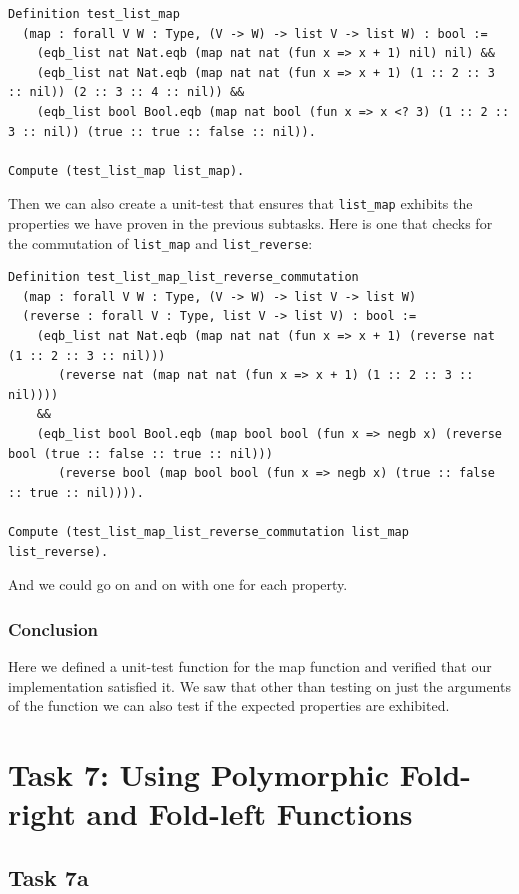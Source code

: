 \documentclass{article}
\begin{document}
\begin{lstlisting}
Definition test_list_map
  (map : forall V W : Type, (V -> W) -> list V -> list W) : bool :=
    (eqb_list nat Nat.eqb (map nat nat (fun x => x + 1) nil) nil) &&
    (eqb_list nat Nat.eqb (map nat nat (fun x => x + 1) (1 :: 2 :: 3 :: nil)) (2 :: 3 :: 4 :: nil)) &&
    (eqb_list bool Bool.eqb (map nat bool (fun x => x <? 3) (1 :: 2 :: 3 :: nil)) (true :: true :: false :: nil)).

Compute (test_list_map list_map).
\end{lstlisting}

Then we can also create a unit-test that ensures that \texttt{list\_map} exhibits the properties we have proven in the previous subtasks. Here is one that checks for the commutation of \texttt{list\_map} and \texttt{list\_reverse}:

\begin{lstlisting}
Definition test_list_map_list_reverse_commutation
  (map : forall V W : Type, (V -> W) -> list V -> list W)
  (reverse : forall V : Type, list V -> list V) : bool :=
    (eqb_list nat Nat.eqb (map nat nat (fun x => x + 1) (reverse nat (1 :: 2 :: 3 :: nil))) 
       (reverse nat (map nat nat (fun x => x + 1) (1 :: 2 :: 3 :: nil))))
    &&
    (eqb_list bool Bool.eqb (map bool bool (fun x => negb x) (reverse bool (true :: false :: true :: nil))) 
       (reverse bool (map bool bool (fun x => negb x) (true :: false :: true :: nil)))).

Compute (test_list_map_list_reverse_commutation list_map list_reverse).
\end{lstlisting}

And we could go on and on with one for each property.

\subsubsection{Conclusion}
Here we defined a unit-test function for the map function and verified that our implementation satisfied it. We saw that other than testing on just the arguments of the function we can also test if the expected properties are exhibited.

\newpage

\section{Task 7: Using Polymorphic Fold-right and Fold-left Functions}

\subsection{Task 7a}
\end{document}

